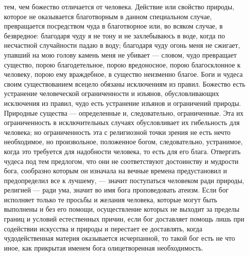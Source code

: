 \documentclass[12pt,oneside]{book}
\begin{document}
тем, чем божество отличается от человека. Действие или свойство природы, которое не оказывается благотворным в данном специальном случае, превращается посредством чуда в благотворное или, во всяком случае, в безвредное: благодаря чуду я не тону и не захлебываюсь в воде, когда по несчастной случайности падаю в воду; благодаря чуду огонь меня не сжигает, упавший на мою голову камень меня не убивает --- словом, чудо превращает существо, порою благодетельное, порою вредоносное, порою благосклонное к человеку, порою ему враждебное, в существо неизменно благое. Боги и чудеса своим существованием всецело обязаны исключениям из правил. Божество есть устранение человеческой ограниченности и изъянов, обусловливающих исключения из правил, чудо есть устранение изъянов и ограничений природы. Природные существа --- определенные и, следовательно, ограниченные. Эта их ограниченность в исключительных случаях обусловливает их гибельность для человека; но ограниченность эта с религиозной точки зрения не есть нечто необходимое, но произвольное, положенное богом, следовательно, устранимое, когда это требуется для надобности человека, то есть для его блага. Отвергать чудеса под тем предлогом, что они не соответствуют достоинству и мудрости бога, сообразно которым он изначала на вечные времена предустановил и предопределил все к лучшему, --- значит поступаться человеком ради природы, религией --- ради ума, значит во имя бога проповедовать атеизм. Если бог исполняет только те просьбы и желания человека, которые могут быть выполнены и без его помощи, осуществление которых не выходит за пределы границ и условий естественных причин, если бог доставляет помощь лишь при содействии искусства и природы и перестает ее доставлять, когда чудодейственная материя оказывается исчерпанной, то такой бог есть не что иное, как прикрытая именем бога олицетворенная необходимость.


\chapter{}
\end{document}
